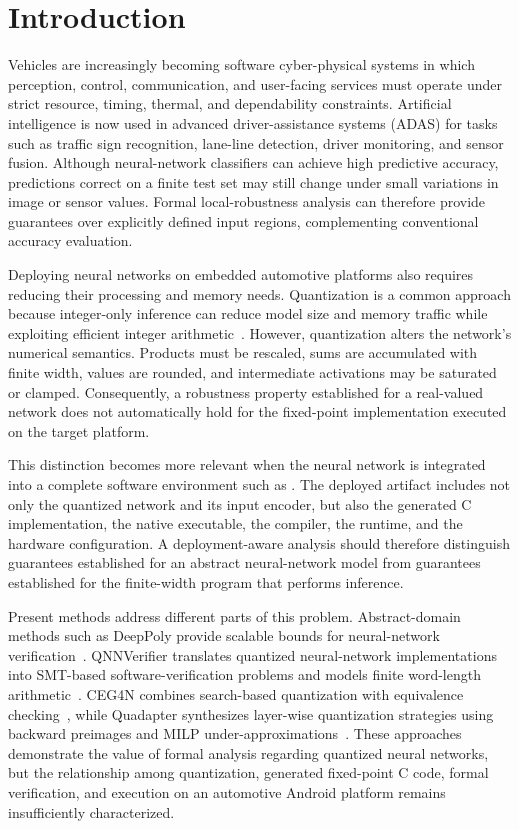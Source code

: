 
\section{Introduction}
\label{sec:introduction}
Vehicles are increasingly becoming software cyber-physical systems in which perception, control, communication, and user-facing services must operate under strict resource, timing, thermal, and dependability constraints. Artificial intelligence is now used in advanced driver-assistance systems (ADAS) for tasks such as traffic sign recognition, lane-line detection, driver monitoring, and sensor fusion. Although neural-network classifiers can achieve high predictive accuracy, predictions correct on a finite test set may still change under small variations in image or sensor values. Formal local-robustness analysis can therefore provide guarantees over explicitly defined input regions, complementing conventional accuracy evaluation.

Deploying neural networks on embedded automotive platforms also requires reducing their processing and memory needs. Quantization is a common approach because integer-only inference can reduce model size and memory traffic while exploiting efficient integer arithmetic~\cite{Jacob2018Integer}. However, quantization alters the network's numerical semantics. Products must be rescaled, sums are accumulated with finite width, values are rounded, and intermediate activations may be saturated or clamped. Consequently, a robustness property established for a real-valued network does not automatically hold for the fixed-point implementation executed on the target platform.

This distinction becomes more relevant when the neural network is integrated into a complete software environment such as \AAOS{}. The deployed artifact includes not only the quantized network and its input encoder, but also the generated C implementation, the native executable, the compiler, the runtime, and the hardware configuration. A deployment-aware analysis should therefore distinguish guarantees established for an abstract neural-network model from guarantees established for the finite-width program that performs inference.

Present methods address different parts of this problem. Abstract-domain methods such as DeepPoly provide scalable bounds for neural-network verification~\cite{Singh2019DeepPoly}. QNNVerifier translates quantized neural-network implementations into SMT-based software-verification problems and models finite word-length arithmetic~\cite{Song2021QNNVerifier}. CEG4N combines search-based quantization with equivalence checking~\cite{Matos2022CEG4N}, while Quadapter synthesizes layer-wise quantization strategies using backward preimages and MILP under-approximations~\cite{Zhang2024Quadapter}. These approaches demonstrate the value of formal analysis regarding quantized neural networks, but the relationship among quantization, generated fixed-point C code, formal verification, and execution on an automotive Android platform remains insufficiently characterized.

